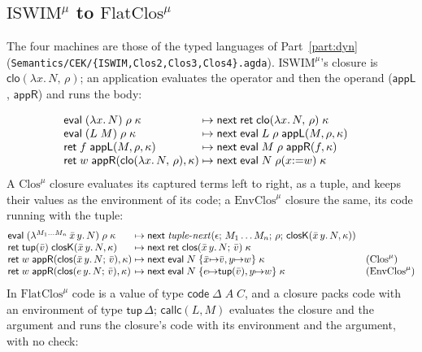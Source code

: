 \documentclass[10pt]{article}
\theoremstyle{acmplain}
\newcommand{\key}[1]{\mathsf{#1}}
\newcommand{\lam}[1]{\lambda #1.\,}
\newcommand{\clos}[2]{\lambda^{#1}\, #2.\,}
\newcommand{\ext}[3]{#1(#2{:=}#3)}
\newcommand{\ev}[3]{\key{eval}\;#1\;#2\;#3}
\newcommand{\rt}[2]{\key{ret}\;#1\;#2}
\newcommand{\nxt}{\key{next}\;}
\newcommand{\cloV}[2]{\key{clo}(#1,\, #2)}
\newcommand{\closV}[2]{\key{clos}(#1;\, #2)}
\newcommand{\tupV}[1]{\key{tup}(#1)}
\newcommand{\Kf}[2]{\key{#1}(#2)}
\newcommand{\tnext}{\mathit{tuple\text{-}next}}
\newcommand{\Tcallc}[2]{\key{callc}(#1, #2)}   %
\newcommand{\Ml}[1]{\textrm{#1}^{\mu}}                  %
\newcommand{\Mtup}[1]{\key{tup}\,#1}                      %
\newcommand{\Mcodety}[3]{\key{code}\;#1\;#2\;#3}          %
\begin{document}
\subsection{\texorpdfstring{$\Ml{ISWIM}$ to $\Ml{FlatClos}$}{ISWIM-mu to FlatClos-mu}}

\begin{sloppypar}
The four machines are those of the typed languages of Part~\ref{part:dyn}
(\texttt{Semantics/CEK/\{ISWIM,Clos2,Clos3,Clos4\}.agda}).
$\Ml{ISWIM}$'s closure is $\cloV{\lam{x} N}{\rho}$; an application
evaluates the operator and then the operand ($\key{appL}$, $\key{appR}$)
and runs the body:
\end{sloppypar}
\[
\begin{array}{@{}l@{\;\mapsto\;}l@{\quad}l@{}}
  \ev{(\lam{x} N)}{\rho}{\kappa} & \nxt \rt{\cloV{\lam{x} N}{\rho}}{\kappa} \\
  \ev{(L\;M)}{\rho}{\kappa} & \nxt \ev{L}{\rho}{\Kf{appL}{M, \rho, \kappa}} \\
  \rt{f}{\Kf{appL}{M, \rho, \kappa}} & \nxt \ev{M}{\rho}{\Kf{appR}{f, \kappa}} \\
  \rt{w}{\Kf{appR}{\cloV{\lam{x} N}{\rho}, \kappa}} & \nxt \ev{N}{\ext{\rho}{x}{w}}{\kappa}
\end{array}
\]
A $\Ml{Clos}$ closure evaluates its captured terms left to right, as a
tuple, and keeps their values as the environment of its code; a
$\Ml{EnvClos}$ closure the same, its code running with the tuple:
\[
\begin{array}{@{}l@{\;\mapsto\;}l@{\quad}l@{}}
  \ev{(\clos{M_1 \ldots M_n}{\bar{x}\, y} N)}{\rho}{\kappa} &
    \nxt \tnext(\epsilon;\, M_1 \ldots M_n;\, \rho;\, \Kf{closK}{\bar{x}\, y.\, N, \kappa}) \\
  \rt{\tupV{\bar{v}}}{\Kf{closK}{\bar{x}\, y.\, N, \kappa}} & \nxt \rt{\closV{\bar{x}\, y.\, N}{\bar{v}}}{\kappa} \\
  \rt{w}{\Kf{appR}{\closV{\bar{x}\, y.\, N}{\bar{v}}, \kappa}} & \nxt \ev{N}{\{\bar{x} {\mapsto} \bar{v}, y {\mapsto} w\}}{\kappa}
    & (\Ml{Clos}) \\
  \rt{w}{\Kf{appR}{\closV{e\, y.\, N}{\bar{v}}, \kappa}} & \nxt \ev{N}{\{e {\mapsto} \tupV{\bar{v}}, y {\mapsto} w\}}{\kappa}
    & (\Ml{EnvClos})
\end{array}
\]
In $\Ml{FlatClos}$ code is a value of type $\Mcodety{\Delta}{A}{C}$, and a
closure packs code with an environment of type $\Mtup{\Delta}$;
$\Tcallc{L}{M}$ evaluates the closure and the argument and runs the
closure's code with its environment and the argument, with no check:
\end{document}
